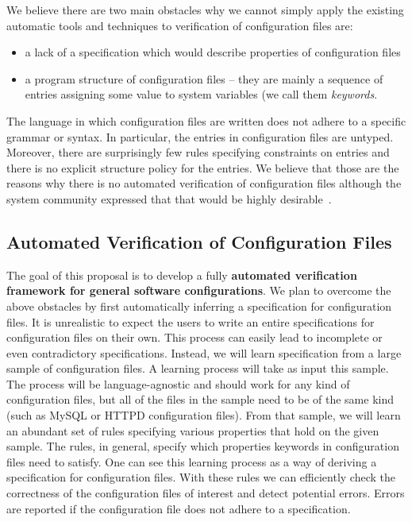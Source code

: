 We believe there are two main obstacles 
why we cannot simply apply the existing automatic 
tools and techniques to verification of configuration files are:
\begin{itemize}
\item a lack
of a specification which would describe properties of configuration files
\item a program structure of configuration files -- they
are mainly a sequence of entries assigning some value to system variables (we call them {\emph {keywords}}. 
\end{itemize}
The language in which configuration files are written does 
not adhere to a specific grammar or syntax. In particular, the
entries in configuration files are untyped. Moreover, there are surprisingly few rules specifying constraints on entries and there
is no explicit structure policy for the entries.
We believe that those are the reasons why there is no automated verification of configuration 
files although the system community expressed that that would be highly
desirable~\cite{wang04automatic, zhang14encore, xu15systems}.


\subsection{Automated Verification of Configuration Files}
\label{sec:intro-goal}

The goal of this proposal is to develop a fully {\bf {automated 
verification  framework for general software configurations}}. We plan to
overcome the above obstacles by first automatically inferring a
specification for configuration files. It is unrealistic to expect the 
users to write an entire specifications for configuration files on their own. 
This process can easily lead to incomplete or even contradictory 
specifications. Instead, we will learn specification from 
a large sample of 
configuration files. A learning process will take as input this 
sample. The process will be language-agnostic and should work for any kind 
of configuration files,  but all of the files in the sample need to be of 
the same kind (such as MySQL or 
HTTPD configuration files). From that sample, we will learn an abundant set of rules 
specifying various properties that hold on the given sample. The rules, in general, 
specify which properties keywords in configuration files need to satisfy. One can see this learning process as 
a way of deriving  a specification for configuration files. With these  rules we can efficiently check 
the correctness of the configuration files of interest and detect 
potential errors. Errors are reported if the configuration file does not 
adhere to a specification.

